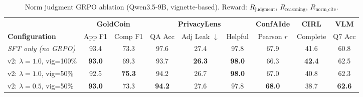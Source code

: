 \begin{table}[ht]
\centering
\caption{Norm judgment GRPO ablation (Qwen3.5-9B, vignette-based). Reward: $R_{\text{judgment}}$, $R_{\text{reasoning}}$, $R_{\text{norm\_cite}}$.}
\label{tab:grpo-v2}
\begin{tabular}{lcccccccc}
\toprule
 & \multicolumn{2}{c}{\textbf{GoldCoin}} & \multicolumn{3}{c}{\textbf{PrivacyLens}} & \multicolumn{1}{c}{\textbf{ConfAIde}} & \multicolumn{1}{c}{\textbf{CIRL}} & \multicolumn{1}{c}{\textbf{VLM}} \\
\cmidrule(lr){2-3} \cmidrule(lr){4-6} \cmidrule(lr){7-7} \cmidrule(lr){8-8} \cmidrule(lr){9-9}
\textbf{Configuration} & App F1 & Comp F1 & QA Acc & Adj Leak $\downarrow$ & Helpful & Pearson $r$ & Complete & Q7 Acc \\
\midrule
\textit{SFT only (no GRPO)} & 93.4 & 73.3 & 97.6 & 27.4 & 97.8 & 67.9 & 41.6 & 60.8 \\
\midrule
v2: $\lambda=1.0$, vig=100\% & \textbf{93.0} & 69.3 & 93.7 & \textbf{26.3} & \textbf{98.0} & 66.3 & \textbf{42.4} & 62.5 \\
v2: $\lambda=1.0$, vig=50\% & 92.5 & \textbf{75.3} & 94.2 & 26.7 & \textbf{98.0} & 67.0 & 40.8 & 62.3 \\
v2: $\lambda=0.5$, vig=50\% & \textbf{93.0} & 73.3 & \textbf{94.2} & 27.6 & 97.8 & \textbf{68.0} & 38.7 & \textbf{62.6} \\
\bottomrule
\end{tabular}
\end{table}